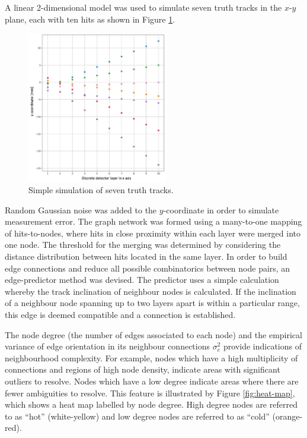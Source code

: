 A linear 2-dimensional model was used to simulate seven truth tracks in the $x$-$y$ plane, each with ten hits as shown in Figure \ref{fig:ground-truth}. 

\begin{figure}[htbp]
    \centering
    \includegraphics[width=0.55\textwidth]{images/5-gnn-algorithm/ground-truth.png}
    \caption{Simple simulation of seven truth tracks.}
    \label{fig:ground-truth}%
\end{figure}


Random Gaussian noise was added to the $y$-coordinate in order to simulate measurement error. The graph network was formed using a many-to-one mapping of hits-to-nodes, where hits in close proximity within each layer were merged into one node. The threshold for the merging was determined by considering the distance distribution between hits located in the same layer. In order to build edge connections and reduce all possible combinatorics between node pairs, an edge-predictor method was devised. The predictor uses a simple calculation whereby the track inclination of neighbour nodes is calculated. If the inclination of a neighbour node spanning up to two layers apart is within a particular range, this edge is deemed compatible and a connection is established. 

The node degree (the number of edges associated to each node) and the empirical variance of edge orientation in its neighbour connections $\sigma_{e}^{2}$ provide indications of neighbourhood complexity. For example, nodes which have a high multiplicity of connections and regions of high node density, indicate areas with significant outliers to resolve. Nodes which have a low degree indicate areas where there are fewer ambiguities to resolve. This feature is illustrated by Figure \ref{fig:heat-map}, which shows a heat map labelled by node degree. High degree nodes are referred to as ``hot'' (white-yellow) and low degree nodes are referred to as ``cold'' (orange-red).


